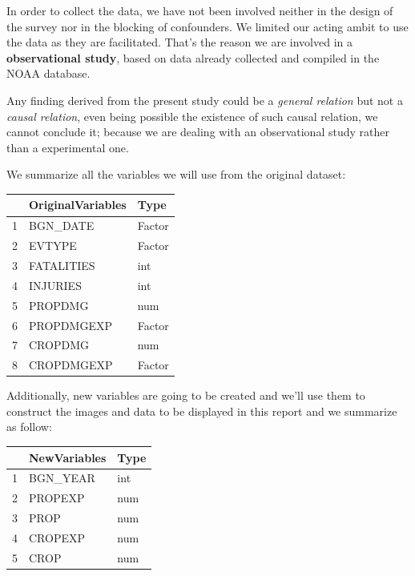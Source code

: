 \documentclass[12pt,spanish, american,b4paper, onecolumn, lmargin=1cm, rmargin=1cm, tmargin=1cm, bmargin=2cm,]{article}
\begin{document}
In order to collect the data, we have not been involved neither in the
design of the survey nor in the blocking of confounders. We limited our
acting ambit to use the data as they are facilitated. That's the reason
we are involved in a \textbf{observational study}, based on data already
collected and compiled in the NOAA database.

Any finding derived from the present study could be a \emph{general
relation} but not a \emph{causal relation}, even being possible the
existence of such causal relation, we cannot conclude it; because we are
dealing with an observational study rather than a experimental one.

We summarize all the variables we will use from the original dataset:

\begin{table}[ht]
\centering
\begin{tabular}{rll}
  \toprule
 & OriginalVariables & Type \\ 
  \midrule
1 & BGN\_DATE & Factor \\ 
  2 & EVTYPE & Factor \\ 
  3 & FATALITIES & int \\ 
  4 & INJURIES & int \\ 
  5 & PROPDMG & num \\ 
  6 & PROPDMGEXP & Factor \\ 
  7 & CROPDMG & num \\ 
  8 & CROPDMGEXP & Factor \\ 
   \bottomrule
\end{tabular}
\end{table}

Additionally, new variables are going to be created and we'll use them
to construct the images and data to be displayed in this report and we
summarize as follow:

\begin{table}[ht]
\centering
\begin{tabular}{rll}
  \toprule
 & NewVariables & Type \\ 
  \midrule
1 & BGN\_YEAR & int \\ 
  2 & PROPEXP & num \\ 
  3 & PROP & num \\ 
  4 & CROPEXP & num \\ 
  5 & CROP & num \\ 
   \bottomrule
\end{tabular}
\end{table}
\end{document}
